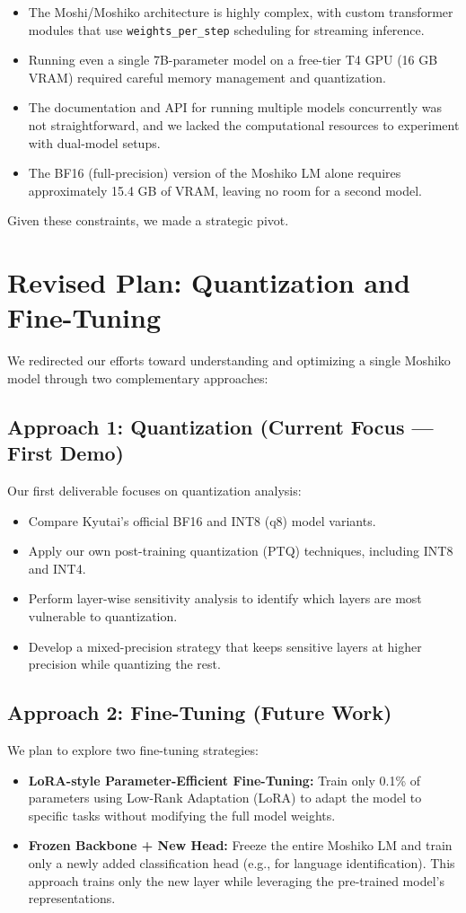 \documentclass[12pt,a4paper]{report}
\begin{document}
\begin{itemize}
    \item The Moshi/Moshiko architecture is highly complex, with custom transformer modules that use \texttt{weights\_per\_step} scheduling for streaming inference.
    \item Running even a single 7B-parameter model on a free-tier T4 GPU (16 GB VRAM) required careful memory management and quantization.
    \item The documentation and API for running multiple models concurrently was not straightforward, and we lacked the computational resources to experiment with dual-model setups.
    \item The BF16 (full-precision) version of the Moshiko LM alone requires approximately 15.4 GB of VRAM, leaving no room for a second model.
\end{itemize}

Given these constraints, we made a strategic pivot.

\section{Revised Plan: Quantization and Fine-Tuning}
We redirected our efforts toward understanding and optimizing a single Moshiko model through two complementary approaches:

\subsection{Approach 1: Quantization (Current Focus --- First Demo)}
Our first deliverable focuses on quantization analysis:
\begin{itemize}
    \item Compare Kyutai's official BF16 and INT8 (q8) model variants.
    \item Apply our own post-training quantization (PTQ) techniques, including INT8 and INT4.
    \item Perform layer-wise sensitivity analysis to identify which layers are most vulnerable to quantization.
    \item Develop a mixed-precision strategy that keeps sensitive layers at higher precision while quantizing the rest.
\end{itemize}

\subsection{Approach 2: Fine-Tuning (Future Work)}
We plan to explore two fine-tuning strategies:
\begin{itemize}
    \item \textbf{LoRA-style Parameter-Efficient Fine-Tuning:} Train only 0.1\% of parameters using Low-Rank Adaptation (LoRA) to adapt the model to specific tasks without modifying the full model weights.
    \item \textbf{Frozen Backbone + New Head:} Freeze the entire Moshiko LM and train only a newly added classification head (e.g., for language identification). This approach trains only the new layer while leveraging the pre-trained model's representations.
\end{itemize}
\end{document}

